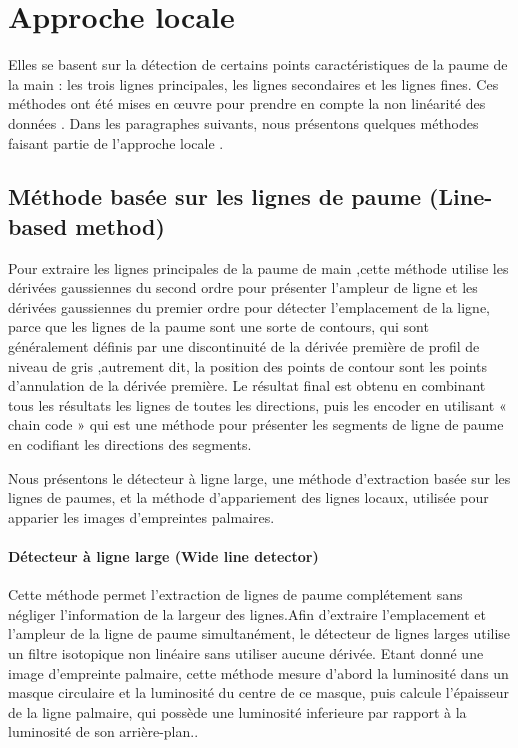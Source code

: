 {{\section{Approche locale }
Elles se basent sur la détection de certains points caractéristiques de la paume de la main : les trois lignes principales, les lignes secondaires et les lignes fines. Ces méthodes ont été mises en œuvre pour prendre en compte la non linéarité des données \citep{zhang2012comparative}. Dans les paragraphes suivants, nous présentons quelques méthodes faisant partie de l’approche locale .
\subsection{Méthode basée sur les lignes de paume (Line-based method)}

Pour extraire les lignes principales de la paume de main ,cette méthode utilise les dérivées gaussiennes du second ordre pour présenter l’ampleur de ligne et les dérivées gaussiennes du premier ordre pour détecter l’emplacement de la ligne, parce que les lignes de la paume sont une sorte de contours, qui sont généralement définis par une discontinuité de la dérivée première de profil de niveau de gris ,autrement dit, la position des points de contour sont les points d’annulation de la dérivée première\citep{wu2006palm}.
Le résultat final est obtenu en combinant tous les résultats les lignes de toutes les directions, puis les encoder en utilisant « chain code » qui est une méthode pour présenter les segments de ligne de paume en codifiant les directions des segments. 

Nous présentons le détecteur à ligne large, une méthode d’extraction basée sur les lignes de paumes, et la méthode d’appariement des lignes locaux, utilisée pour apparier les images d’empreintes palmaires.

\paragraph{Détecteur à ligne large (Wide line detector)}
Cette méthode permet l’extraction de lignes de paume complétement sans négliger l’information de la largeur des lignes.Afin d’extraire l’emplacement et l’ampleur de la ligne de paume simultanément, le détecteur de lignes larges utilise un filtre isotopique non linéaire sans utiliser aucune dérivée.
Etant donné une image d’empreinte palmaire, cette méthode mesure d’abord la luminosité dans un masque circulaire et la luminosité du centre de ce masque, puis calcule l’épaisseur de la ligne palmaire, qui possède une luminosité inferieure par rapport à la luminosité de son arrière-plan.\citep{liu2007detecting}. 
}}
